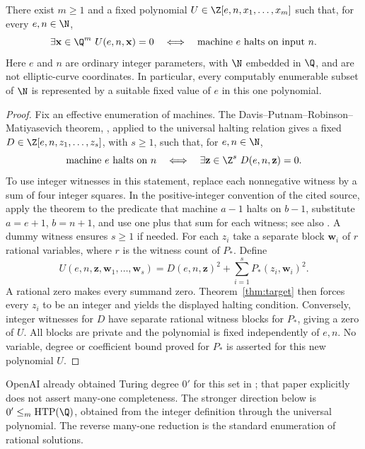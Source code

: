 \begin{corollary}
\label{cor:rational-universal}
There exist $m\ge1$ and a fixed polynomial
$U\in\Z[e,n,x_1,\ldots,x_m]$ such that, for every $e,n\in\N$,
\[
 \exists\mathbf x\in\Q^m\ U(e,n,\mathbf x)=0
 \quad\Longleftrightarrow\quad
 \text{machine $e$ halts on input $n$}.
\]
Here $e$ and $n$ are ordinary integer parameters, with $\N$ embedded
in $\Q$, and are not elliptic-curve coordinates. In particular, every
computably enumerable subset of $\N$ is represented by a suitable
fixed value of $e$ in this one polynomial.
\end{corollary}
\begin{proof}
Fix an effective enumeration of machines. The Davis--Putnam--Robinson--Matiyasevich theorem, \cite[Basic Theorem, p.~3]{matiyasevich1971},
applied to the universal halting relation gives a fixed
$D\in\Z[e,n,z_1,\ldots,z_s]$, with $s\ge1$, such that, for $e,n\in\N$,
\[
 \text{machine $e$ halts on $n$}
 \quad\Longleftrightarrow\quad
 \exists\mathbf z\in\Z^s\ D(e,n,\mathbf z)=0.
\]
To use integer witnesses in this statement, replace each nonnegative
witness by a sum of four integer squares. In the positive-integer
convention of the cited source, apply the theorem to the predicate
that machine $a-1$ halts on $b-1$, substitute $a=e+1$, $b=n+1$,
and use one plus that sum for each witness; see also
\cite[p.~2]{matiyasevich1971}. A dummy witness ensures $s\ge1$ if needed.
For each $z_i$ take a separate block $\mathbf w_i$ of $r$ rational
variables, where $r$ is the witness count of $P_*$. Define
\[
 U(e,n,\mathbf z,\mathbf w_1,\ldots,\mathbf w_s)
   =D(e,n,\mathbf z)^2+\sum_{i=1}^s P_*(z_i,\mathbf w_i)^2.
\]
A rational zero makes every summand zero. Theorem~\ref{thm:target}
then forces every $z_i$ to be an integer and yields the displayed
halting condition. Conversely, integer witnesses for $D$ have separate
rational witness blocks for $P_*$, giving a zero of $U$. All blocks
are private and the polynomial is fixed independently of $e,n$.
No variable, degree or coefficient bound proved for $P_*$ is asserted
for this new polynomial $U$.
\end{proof}

OpenAI already obtained Turing degree $0'$ for this set in
\cite[Corollary 7.1, pp.~56--57]{openaihtp}; that paper explicitly
does not assert many-one completeness. The stronger direction below
is $0'\le_m\operatorname{HTP}(\Q)$, obtained from the integer
definition through the universal polynomial. The reverse many-one
reduction is the standard enumeration of rational solutions.

